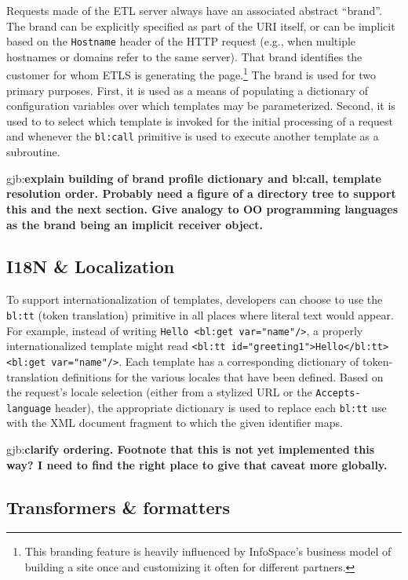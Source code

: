 \documentclass{www2003-submission}
\newcommand{\smtexttt}[1]{{\small\texttt{#1}}}
\newcommand{\gjb}[1]{{\sc gjb:}\textbf{#1}}
\begin{document}
Requests made of the ETL server always have an associated abstract
``brand''.  The brand can be explicitly specified as part of the URI
itself, or can be implicit based on the \smtexttt{Hostname} header of
the HTTP request (e.g., when multiple hostnames or domains refer to
the same server).  That brand identifies the customer for whom ETLS is
generating the page.\footnote{This branding feature is heavily
influenced by InfoSpace's business model of building a site once and
customizing it often for different partners.}  The brand is used for
two primary purposes.  First, it is used as a means of populating a
dictionary of configuration variables over which templates may be
parameterized.  Second, it is used to to select which template is
invoked for the initial processing of a request and whenever the
\smtexttt{bl:call} primitive is used to execute another template as a
subroutine.

\gjb{explain building of brand profile dictionary and
bl:call, template resolution order.  Probably need a figure of a
directory tree to support this and the next section.  Give analogy to
OO programming languages as the brand being an implicit receiver
object.}

\subsection{I18N \& Localization}
\label{ssec-localization}

To support internationalization of templates, developers can choose to
use the \smtexttt{bl:tt} (token translation) primitive in all places
where literal text would appear.  For example, instead of writing
\smtexttt{Hello <bl:get var="name"/>}, a properly internationalized
template might read \smtexttt{<bl:tt id="greeting1">Hello</bl:tt>
<bl:get var="name"/>}. Each template has a corresponding dictionary of
token-translation definitions for the various locales that have been
defined.  Based on the request's locale selection (either from a
stylized URL or the \smtexttt{Accepts-language} header), the
appropriate dictionary is used to replace each \smtexttt{bl:tt} use
with the XML document fragment to which the given identifier maps.

\gjb{clarify ordering.  Footnote that this is not yet
implemented this way?  I need to find the right place to give that
caveat more globally.}

\subsection{Transformers \& formatters}
\label{ssec-transformers}
\end{document}
